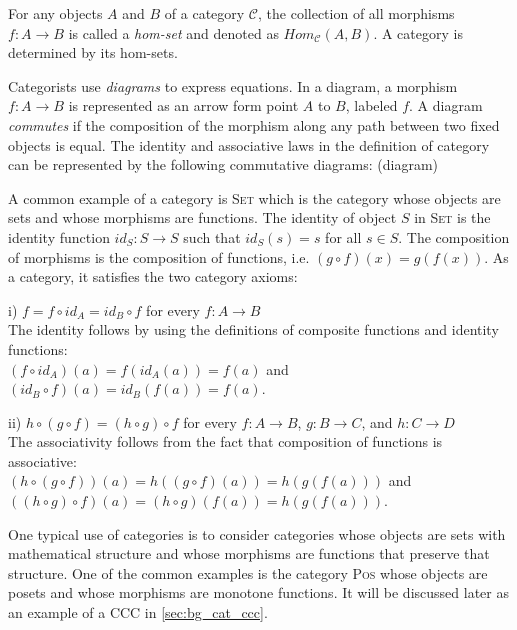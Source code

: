 For any objects $ A $ and $ B $ of a category $ \mathcal{C} $, the collection of all morphisms $ f: A \to B $ is called a \emph{hom-set} and denoted as $ Hom_\mathcal{C}(A,B) $. A category is determined by its hom-sets.

Categorists use \emph{diagrams} to express equations. In a diagram, a morphism $ f: A \to B $ is represented as an arrow form point $ A $ to $ B $, labeled $ f $. A diagram \emph{commutes} if the composition of the morphism along any path between two fixed objects is equal. The identity and associative laws in the definition of category can be represented by the following commutative diagrams:
(diagram)

A common example of a category is \textsc{Set} which is the category whose objects are sets and whose morphisms are functions. The identity of object $ S $ in \textsc{Set} is the identity function $ id_S : S \to S $ such that $ id_S(s) = s $ for all $ s \in S $. The composition of morphisms is the composition of functions, i.e. $ (g \circ f)(x) = g(f(x)) $. As a category, it satisfies the two category axioms:
\begin{myitemize}
\item[i)] $ f = f \circ id_A = id_B \circ f $ for every $ f: A \to B $\\
The identity follows by using the definitions of composite functions and identity functions:\\
$ (f \circ id_A)(a) = f(id_A(a)) = f(a) $ and $ (id_B \circ f)(a) = id_B(f(a)) = f(a) $.
\item[ii)] $ h \circ (g \circ f) = (h \circ g) \circ f $ for every $ f: A \to B $, $ g: B \to C$, and $ h: C \to D $\\
The associativity follows from the fact that composition of functions is associative:\\
$ (h \circ (g \circ f))(a) = h((g \circ f)(a)) = h(g(f(a))) $ and\\
$ ((h \circ g) \circ f)(a) = (h \circ g)(f(a)) = h(g(f(a))) $.
\end{myitemize}

One typical use of categories is to consider categories whose objects are sets with mathematical structure and whose morphisms are functions that preserve that structure. One of the common examples is the category \textsc{Pos} whose objects are posets and whose morphisms are monotone functions. It will be discussed later as an example of a CCC in \ref{sec:bg_cat_ccc}.


